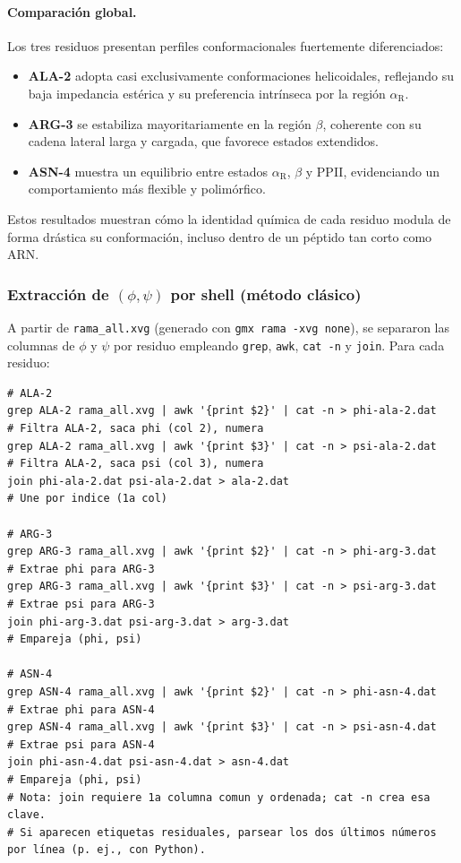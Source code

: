 \documentclass[12pt,a4paper]{article}
\begin{document}
\paragraph{Comparación global.}
Los tres residuos presentan perfiles conformacionales fuertemente diferenciados:

\begin{itemize}
    \item \textbf{ALA-2} adopta casi exclusivamente conformaciones helicoidales, reflejando su baja impedancia estérica y su preferencia intrínseca por la región $\alpha_{\mathrm{R}}$.
    \item \textbf{ARG-3} se estabiliza mayoritariamente en la región $\beta$, coherente con su cadena lateral larga y cargada, que favorece estados extendidos.
    \item \textbf{ASN-4} muestra un equilibrio entre estados $\alpha_{\mathrm{R}}$, $\beta$ y PPII, evidenciando un comportamiento más flexible y polimórfico.
\end{itemize}

Estos resultados muestran cómo la identidad química de cada residuo modula de forma drástica su conformación, incluso dentro de un péptido tan corto como ARN.

\subsubsection*{Extracción de \texorpdfstring{$(\phi,\psi)$}{(phi,psi)} por shell (método clásico)}
\label{sec:phi-psi-shell}

A partir de \texttt{rama\_all.xvg} (generado con \texttt{gmx rama -xvg none}), se separaron las columnas de \(\phi\) y \(\psi\) por residuo empleando \texttt{grep}, \texttt{awk}, \texttt{cat -n} y \texttt{join}. Para cada residuo:

\begin{lstlisting}[style=bashstyle,texcl=false]
# ALA-2
grep ALA-2 rama_all.xvg | awk '{print $2}' | cat -n > phi-ala-2.dat   
# Filtra ALA-2, saca phi (col 2), numera
grep ALA-2 rama_all.xvg | awk '{print $3}' | cat -n > psi-ala-2.dat   
# Filtra ALA-2, saca psi (col 3), numera
join phi-ala-2.dat psi-ala-2.dat > ala-2.dat                          
# Une por indice (1a col)

# ARG-3
grep ARG-3 rama_all.xvg | awk '{print $2}' | cat -n > phi-arg-3.dat   
# Extrae phi para ARG-3
grep ARG-3 rama_all.xvg | awk '{print $3}' | cat -n > psi-arg-3.dat   
# Extrae psi para ARG-3
join phi-arg-3.dat psi-arg-3.dat > arg-3.dat                          
# Empareja (phi, psi)

# ASN-4
grep ASN-4 rama_all.xvg | awk '{print $2}' | cat -n > phi-asn-4.dat   
# Extrae phi para ASN-4
grep ASN-4 rama_all.xvg | awk '{print $3}' | cat -n > psi-asn-4.dat   
# Extrae psi para ASN-4
join phi-asn-4.dat psi-asn-4.dat > asn-4.dat                          
# Empareja (phi, psi)
# Nota: join requiere 1a columna comun y ordenada; cat -n crea esa clave.
# Si aparecen etiquetas residuales, parsear los dos últimos números por línea (p. ej., con Python).
\end{lstlisting}
\end{document}
